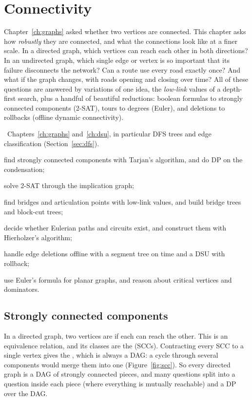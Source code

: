\chapter{Connectivity}\label{ch:connectivity}

Chapter~\ref{ch:graphs} asked whether two vertices are connected. This chapter asks how \emph{robustly} they are connected, and
what the connections look like at a finer scale. In a directed graph, which vertices can reach each other in both directions?
In an undirected graph, which single edge or vertex is so important that its failure disconnects the network? Can a route use
every road exactly once? And what if the graph changes, with roads opening and closing over time? All of these questions are
answered by variations of one idea, the \emph{low-link} values of a depth-first search, plus a handful of beautiful reductions:
boolean formulas to strongly connected components (2-SAT), tours to degrees (Euler), and deletions to rollbacks (offline dynamic
connectivity).

\begin{chapterintro}{\plat\ \ioi}{Chapters~\ref{ch:graphs} and~\ref{ch:dsu}, in particular DFS trees and edge
classification (Section~\ref{sec:dfs}).}
  \item find strongly connected components with Tarjan's algorithm, and do DP on the condensation;
  \item solve 2-SAT through the implication graph;
  \item find bridges and articulation points with low-link values, and build bridge trees and block-cut trees;
  \item decide whether Eulerian paths and circuits exist, and construct them with Hierholzer's algorithm;
  \item handle edge deletions offline with a segment tree on time and a DSU with rollback;
  \item use Euler's formula for planar graphs, and reason about critical vertices and dominators.
\end{chapterintro}

\section[Strongly connected components]{Strongly connected components \hfill \plat}\label{sec:scc}

In a directed graph, two vertices are  if each can reach the other. This is an equivalence relation,
and its classes are the  (SCCs). Contracting every SCC to a single vertex gives the
, which is always a DAG: a cycle through several components would merge them into one
(Figure~\ref{fig:scc}). So every directed graph is a DAG of strongly connected pieces, and many questions split into a question
inside each piece (where everything is mutually reachable) and a DP over the DAG.

